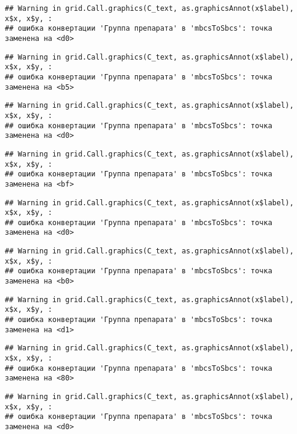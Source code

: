 \documentclass[
]{article}
\begin{document}
\begin{verbatim}
## Warning in grid.Call.graphics(C_text, as.graphicsAnnot(x$label), x$x, x$y, :
## ошибка конвертации 'Группа препарата' в 'mbcsToSbcs': точка заменена на <d0>
\end{verbatim}

\begin{verbatim}
## Warning in grid.Call.graphics(C_text, as.graphicsAnnot(x$label), x$x, x$y, :
## ошибка конвертации 'Группа препарата' в 'mbcsToSbcs': точка заменена на <b5>
\end{verbatim}

\begin{verbatim}
## Warning in grid.Call.graphics(C_text, as.graphicsAnnot(x$label), x$x, x$y, :
## ошибка конвертации 'Группа препарата' в 'mbcsToSbcs': точка заменена на <d0>
\end{verbatim}

\begin{verbatim}
## Warning in grid.Call.graphics(C_text, as.graphicsAnnot(x$label), x$x, x$y, :
## ошибка конвертации 'Группа препарата' в 'mbcsToSbcs': точка заменена на <bf>
\end{verbatim}

\begin{verbatim}
## Warning in grid.Call.graphics(C_text, as.graphicsAnnot(x$label), x$x, x$y, :
## ошибка конвертации 'Группа препарата' в 'mbcsToSbcs': точка заменена на <d0>
\end{verbatim}

\begin{verbatim}
## Warning in grid.Call.graphics(C_text, as.graphicsAnnot(x$label), x$x, x$y, :
## ошибка конвертации 'Группа препарата' в 'mbcsToSbcs': точка заменена на <b0>
\end{verbatim}

\begin{verbatim}
## Warning in grid.Call.graphics(C_text, as.graphicsAnnot(x$label), x$x, x$y, :
## ошибка конвертации 'Группа препарата' в 'mbcsToSbcs': точка заменена на <d1>
\end{verbatim}

\begin{verbatim}
## Warning in grid.Call.graphics(C_text, as.graphicsAnnot(x$label), x$x, x$y, :
## ошибка конвертации 'Группа препарата' в 'mbcsToSbcs': точка заменена на <80>
\end{verbatim}

\begin{verbatim}
## Warning in grid.Call.graphics(C_text, as.graphicsAnnot(x$label), x$x, x$y, :
## ошибка конвертации 'Группа препарата' в 'mbcsToSbcs': точка заменена на <d0>
\end{verbatim}
\end{document}
